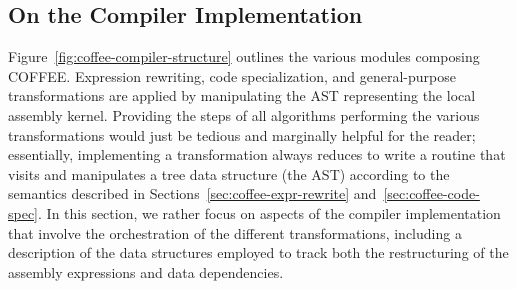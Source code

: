 \subsection{On the Compiler Implementation}
Figure~\ref{fig:coffee-compiler-structure} outlines the various modules composing COFFEE. Expression rewriting, code specialization, and general-purpose transformations are applied by manipulating the AST representing the local assembly kernel. Providing the steps of all algorithms performing the various transformations would just be tedious and marginally helpful for the reader; essentially, implementing a transformation always reduces to write a routine that visits and manipulates a tree data structure (the AST) according to the semantics described in Sections~\ref{sec:coffee-expr-rewrite} and~\ref{sec:coffee-code-spec}. In this section, we rather focus on aspects of the compiler implementation that involve the orchestration of the different transformations, including a description of the data structures employed to track both the restructuring of the assembly expressions and data dependencies. 

